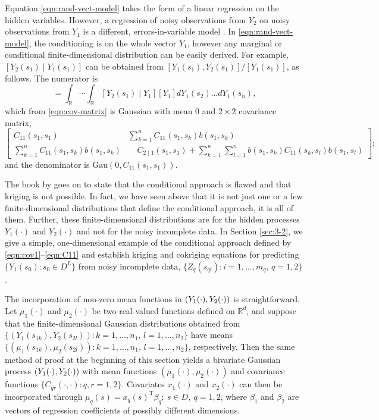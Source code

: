 \documentclass[lineno]{biometrika}
\def\T{{ \mathrm{\scriptscriptstyle T} }}
\newcommand{\svec} {s}
\newcommand{\s}{s}
\renewcommand{\d}{d}
\renewcommand{\x}{x}
\newcommand{\Y}{Y}
\newcommand{\Yvec}{Y}
\newcommand{\bbeta}{\beta}
\newcommand{\bzero}{0}
\newcommand{\Gau}{\mathrm{Gau}}
\newcommand{\RR}{\mathbb{R}}
\let\originalleft\left
\let\originalright\right
\renewcommand{\left}{\mathopen{}\mathclose\bgroup\originalleft}
\renewcommand{\right}{\aftergroup\egroup\originalright}
\begin{document}
Equation \eqref{eqn:rand-vect-model} takes the form of a linear regression on the hidden variables. However, a regression of noisy observations from $Y_2$ on noisy observations from $\Yvec_1$ is a different, errors-in-variable model \citep{Berkson_1950}. In \eqref{eqn:rand-vect-model}, the conditioning is on the whole vector $\Y_1$, however any marginal or conditional finite-dimensional distribution can be easily derived. For example, $[Y_2(\s_1)\mid Y_1(\s_1)]$ can be obtained from $[Y_1(\svec_1),Y_2(\svec_1)]/[Y_1(\svec_1)]$, as follows. The numerator is
\begin{equation*}
  [Y_1(\s_1),Y_2(\s_1)]=\int_{\mathbb{R}}\cdots\int_{\mathbb{R}}[Y_2(\s_1)\mid \Y_1][\Y_1]\d Y_1(\s_2)\ldots\d Y_1(\s_n),
\end{equation*}
which from \eqref{eqn:cov-matrix} is Gaussian with mean $\bzero$ and $2\times 2$ covariance matrix,
\begin{equation*}
\begin{bmatrix} C_{11}(\s_1,\s_1) & \sum_{k=1}^{n}C_{11}(\s_1,\s_k)b(\s_1,\s_k) \\ \sum_{k=1}^{n}C_{11}(\s_1,\s_k)b(\s_1,\s_k) & ~~~~~C_{2\mid 1}(\s_1,\s_1)+\sum_{k=1}^n\sum_{l=1}^n b(\s_1,\s_k)C_{11}(\s_k,\s_l)b(\s_1,\s_l) \end{bmatrix};
\end{equation*}
\noindent and the denominator is $\Gau(0,C_{11}(\svec_1,\svec_1))$.

The book by \citet[p.~273]{Banerjeeetal2015} goes on to state that the conditional approach is flawed and that kriging is not possible. In fact, we have seen above that it is not just one or a few finite-dimensional distributions that define the conditional approach, it is all of them. Further, these finite-dimensional distributions are for the hidden processes $Y_1(\cdot)$ and $Y_2(\cdot)$ and not for the noisy incomplete data. In Section \ref{sec:3-2}, we give a simple, one-dimensional example of the conditional approach defined by \eqref{eqn:cov1}--\eqref{eqn:C11} and establish kriging and cokriging equations for predicting $\{Y_1(\s_0): \s_0 \in D^L\}$ from noisy incomplete data, $\{Z_q(\svec_{qi}):i=1,\dots,m_q,\, q=1,2 \}$. 

The incorporation of non-zero mean functions in $\left(Y_1(\cdot),Y_2(\cdot)\right)$ is straightforward. Let $\mu_1(\cdot)$ and $\mu_2(\cdot)$ be two real-valued functions defined on $\RR^d$, and suppose that the finite-dimensional Gaussian distributions obtained from $\{(Y_1(\s_{1k}), Y_2(\s_{2l})):k=1,\ldots,n_1,\,l=1,\dots,n_2\}$ have means $\{(\mu_1(\s_{1k}),\mu_2(\s_{2l})):k=1,\ldots,n_1,\,l=1,\ldots,n_2\}$, respectively. Then the same method of proof at the beginning of this section yields a bivariate Gaussian process $\left(Y_1(\cdot),Y_2(\cdot)\right)$ with mean functions $(\mu_1(\cdot),\mu_2(\cdot))$ and covariance functions $\{C_{qr}(\cdot,\cdot):q,r=1,2\}$. Covariates $\x_1(\cdot)$ and $\x_2(\cdot)$ can then be incorporated through $\mu_q(\s)=\x_q(\s)^\T\bbeta_q;~\s\in D,~q=1,2$, where $\bbeta_1$ and $\bbeta_2$ are vectors of regression coefficients of possibly different dimensions.
\end{document}
